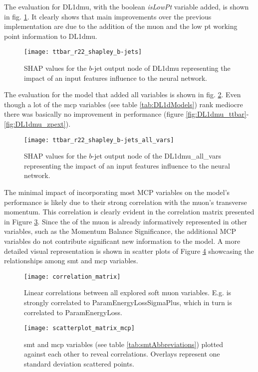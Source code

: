 The evaluation for DL1dmu, with the boolean \textit{isLowPt} variable added, is shown in fig. \ref{fig:shapleyDL1dmu}. It clearly shows that main improvements over the previous implementation are due to the addition of the muon \pt and the low pt working point information to DL1dmu.
\begin{figure}[]
  \centering
  \texttt{[image: ttbar\_r22\_shapley\_b-jets]}
  \caption{SHAP values for the $b$-jet output node of DL1dmu representing the impact of an input features influence to the neural network.}
  \label{fig:shapleyDL1dmu}
\end{figure}
The evaluation for the model that added all variables is shown in fig. \ref{fig:ttbar_r22_shapley_b_all_vars}. Even though a lot of the \ac{mcp} variables (see table \ref{tab:DL1dModels}) rank mediocre there was basically no improvement in performance (figure \ref{fig:DL1dmu_ttbar}-\ref{fig:DL1dmu_zpext}).
\begin{figure}[]
  \centering
  \texttt{[image: ttbar\_r22\_shapley\_b-jets\_all\_vars]}
  \caption{SHAP values for the $b$-jet output node of the DL1dmu\_all\_vars representing the impact of an input features influence to the neural network.}
  \label{fig:ttbar_r22_shapley_b_all_vars}
\end{figure}
The minimal impact of incorporating most MCP variables on the model's performance is likely due to their strong correlation with the muon's transverse momentum. This correlation is clearly evident in the correlation matrix presented in Figure \ref{fig:correlation_matrix}. Since the \pt of the muon is already informatively represented in other variables, such as the Momentum Balance Significance, the additional MCP variables do not contribute significant new information to the model. A more detailed visual representation is shown in scatter plots of Figure \ref{fig:scatterplot_matrix_mcp} showcasing the relationships among \ac{smt} and \ac{mcp} variables.
\begin{figure}[]
  \centering
  \texttt{[image: correlation\_matrix]}
  \caption{Linear correlations between all explored soft muon variables. E.g. \pt is strongly correlated to ParamEnergyLossSigmaPlus, which in turn is  correlated to ParamEnergyLoss. }
  \label{fig:correlation_matrix}
\end{figure}

\begin{figure}[]
  \centering
  \texttt{[image: scatterplot\_matrix\_mcp]}
  \caption{\ac{smt} and \ac{mcp} variables (see table \ref{tab:smtAbbreviations}) plotted against each other to reveal correlations. Overlays represent one standard deviation scattered points.}
  \label{fig:scatterplot_matrix_mcp}
\end{figure}


